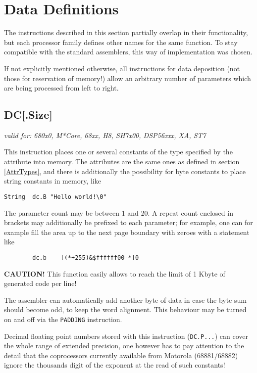 \documentclass[12pt,twoside]{report}
\makeatletter
\newcommand{\bb}[1]{{\bf #1}}
\newcommand{\tty}[1]{{\tt #1}}
\newcommand{\ttindex}[1]{\index{#1@{\tt #1}}}
\makeatother
\begin{document}
\section{Data Definitions}

The instructions described in this section partially overlap in their
functionality, but each processor family defines other names for the
same function.  To stay compatible with the standard assemblers, this
way of implementation was chosen.

If not explicitly mentioned otherwise, all instructions for data
deposition (not those for reservation of memory!) allow an arbitrary
number of parameters which are being processed from left to right.


\subsection{DC[.Size]}
\ttindex{DC}

{\em valid for: 680x0, M*Core, 68xx, H8, SH7x00, DSP56xxx, XA, ST7}
  
This instruction places one or several constants of the type
specified by the attribute into memory.  The attributes are the same ones as
defined in section \ref{AttrTypes}, and there is additionally the
possibility for byte constants to place string constants in memory, like
\begin{verbatim}
String  dc.B "Hello world!\0"
\end{verbatim}
The parameter count may be between 1 and 20.  A repeat count enclosed
in brackets may additionally be prefixed to each parameter; for
example, one can for example fill the area up to the next page
boundary with zeroes with a statement like
\begin{verbatim}
        dc.b    [(*+255)&$ffffff00-*]0
\end{verbatim}
\bb{CAUTION!}  This function easily allows to reach the limit of 1 Kbyte
of generated code per line!

The assembler can automatically add another byte of data in case the byte sum
should become odd, to keep the word alignment.  This behaviour may be
turned on and off via the \tty{PADDING} instruction.

Decimal floating point numbers stored with this instruction (\tty{DC.P...})
can cover the whole range of extended precision, one however has to
pay attention to the detail that the coprocessors currently available
from Motorola (68881/68882) ignore the thousands digit of the
exponent at the read of such constants!
\end{document}
